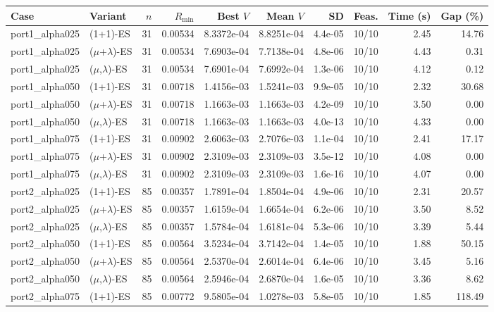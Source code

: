 \begin{tabular}{llrrrrrrrr}
\hline
Case & Variant & $n$ & $R_{\min}$ & Best $V$ & Mean $V$ & SD & Feas. & Time (s) & Gap (\%) \\
\hline
port1\_alpha025 & (1+1)-ES & 31 & 0.00534 & 8.3372e-04 & 8.8251e-04 & 4.4e-05 & 10/10 & 2.45 & 14.76 \\
port1\_alpha025 & ($\mu$+$\lambda$)-ES & 31 & 0.00534 & 7.6903e-04 & 7.7138e-04 & 4.8e-06 & 10/10 & 4.43 & 0.31 \\
port1\_alpha025 & ($\mu$,$\lambda$)-ES & 31 & 0.00534 & 7.6901e-04 & 7.6992e-04 & 1.3e-06 & 10/10 & 4.12 & 0.12 \\
port1\_alpha050 & (1+1)-ES & 31 & 0.00718 & 1.4156e-03 & 1.5241e-03 & 9.9e-05 & 10/10 & 2.32 & 30.68 \\
port1\_alpha050 & ($\mu$+$\lambda$)-ES & 31 & 0.00718 & 1.1663e-03 & 1.1663e-03 & 4.2e-09 & 10/10 & 3.50 & 0.00 \\
port1\_alpha050 & ($\mu$,$\lambda$)-ES & 31 & 0.00718 & 1.1663e-03 & 1.1663e-03 & 4.0e-13 & 10/10 & 4.33 & 0.00 \\
port1\_alpha075 & (1+1)-ES & 31 & 0.00902 & 2.6063e-03 & 2.7076e-03 & 1.1e-04 & 10/10 & 2.41 & 17.17 \\
port1\_alpha075 & ($\mu$+$\lambda$)-ES & 31 & 0.00902 & 2.3109e-03 & 2.3109e-03 & 3.5e-12 & 10/10 & 4.08 & 0.00 \\
port1\_alpha075 & ($\mu$,$\lambda$)-ES & 31 & 0.00902 & 2.3109e-03 & 2.3109e-03 & 1.6e-16 & 10/10 & 4.07 & 0.00 \\
port2\_alpha025 & (1+1)-ES & 85 & 0.00357 & 1.7891e-04 & 1.8504e-04 & 4.9e-06 & 10/10 & 2.31 & 20.57 \\
port2\_alpha025 & ($\mu$+$\lambda$)-ES & 85 & 0.00357 & 1.6159e-04 & 1.6654e-04 & 6.2e-06 & 10/10 & 3.50 & 8.52 \\
port2\_alpha025 & ($\mu$,$\lambda$)-ES & 85 & 0.00357 & 1.5784e-04 & 1.6181e-04 & 5.3e-06 & 10/10 & 3.39 & 5.44 \\
port2\_alpha050 & (1+1)-ES & 85 & 0.00564 & 3.5234e-04 & 3.7142e-04 & 1.4e-05 & 10/10 & 1.88 & 50.15 \\
port2\_alpha050 & ($\mu$+$\lambda$)-ES & 85 & 0.00564 & 2.5370e-04 & 2.6014e-04 & 6.4e-06 & 10/10 & 3.45 & 5.16 \\
port2\_alpha050 & ($\mu$,$\lambda$)-ES & 85 & 0.00564 & 2.5946e-04 & 2.6870e-04 & 1.6e-05 & 10/10 & 3.36 & 8.62 \\
port2\_alpha075 & (1+1)-ES & 85 & 0.00772 & 9.5805e-04 & 1.0278e-03 & 5.8e-05 & 10/10 & 1.85 & 118.49 \\

\end{tabular}
